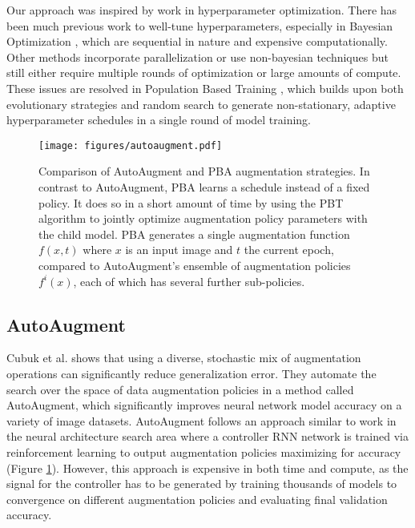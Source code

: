 \documentclass{article}
\begin{document}
Our approach was inspired by work in hyperparameter optimization. There has been much previous work to well-tune hyperparameters, especially in Bayesian Optimization \cite{GP-UCB, TPE, Spearmint, SMAC}, which are sequential in nature and expensive computationally. Other methods incorporate parallelization or use non-bayesian techniques \cite{hyperband, vizier, shahg15, Springenberg2016BayesianOW, Gonzlez2016BatchBO} but still either require multiple rounds of optimization or large amounts of compute. These issues are resolved in Population Based Training \cite{pbt}, which builds upon both evolutionary strategies \cite{Clune2008NaturalSF} and random search \cite{Bergstra2012RandomSF} to generate non-stationary, adaptive hyperparameter schedules in a single round of model training.

\begin{figure}[t]
  \centering
  \texttt{[image: figures/autoaugment.pdf]}
  \caption{Comparison of AutoAugment and PBA augmentation strategies. In contrast to AutoAugment, PBA learns a schedule instead of a fixed policy. It does so in a short amount of time by using the PBT algorithm to jointly optimize augmentation policy parameters with the child model. PBA generates a single augmentation function $f(x, t)$ where $x$ is an input image and $t$ the current epoch, compared to AutoAugment's ensemble of augmentation policies $f^i(x)$, each of which has several further sub-policies.}
  \label{fig:autoaugment}
\end{figure}

\subsection{AutoAugment}
Cubuk et al. shows that using a diverse, stochastic mix of augmentation operations can significantly reduce generalization error. They automate the search over the space of data augmentation policies in a method called AutoAugment, which significantly improves neural network model accuracy on a variety of image datasets. AutoAugment follows an approach similar to work in the neural architecture search area \cite{nas2,enas} where a controller RNN network is trained via reinforcement learning to output augmentation policies maximizing for accuracy (Figure \ref{fig:autoaugment}). However, this approach is expensive in both time and compute, as the signal for the controller has to be generated by training thousands of models to convergence on different augmentation policies and evaluating final validation accuracy.
\end{document}
